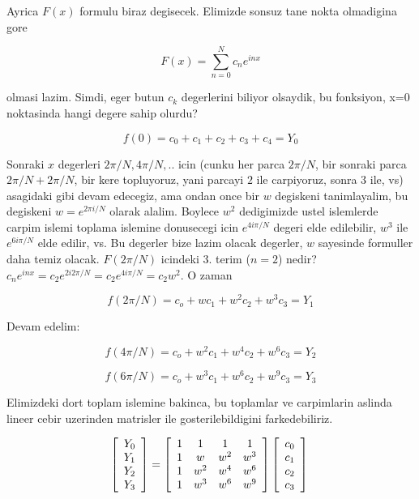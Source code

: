 \documentclass[12pt,fleqn]{article}\usepackage{../common}
\begin{document}
Ayrica $F(x)$ formulu biraz degisecek. Elimizde sonsuz tane nokta olmadigina gore

$$ F(x) = \sum_{n=0}^{N} c_ne^{inx} $$

olmasi lazim. Simdi, eger butun $c_k$ degerlerini biliyor olsaydik, bu
fonksiyon, x=0 noktasinda hangi degere sahip olurdu?

$$ f(0) = c_0 + c_1 + c_2 + c_3 + c_4 = Y_0 $$

Sonraki $x$ degerleri $2\pi/N, 4\pi/N, ..$ icin (cunku her parca $2\pi/N$,
bir sonraki parca $2\pi/N + 2\pi/N$, bir kere topluyoruz, yani parcayi $2$
ile carpiyoruz, sonra $3$ ile, vs) asagidaki gibi devam edecegiz, ama ondan
once bir $w$ degiskeni tanimlayalim, bu degiskeni $w=e^{2\pi i/N}$ olarak
alalim. Boylece $w^2$ dedigimizde ustel islemlerde carpim islemi toplama
islemine donusecegi icin $e^{4i\pi/N}$ degeri elde edilebilir, $w^3$ ile
$e^{6i\pi/N}$ elde edilir, vs. Bu degerler bize lazim olacak degerler, $w$
sayesinde formuller daha temiz olacak. $F(2\pi/N)$ icindeki 3. terim
($n=2$) nedir?  $c_ne^{inx} = c_2e^{2i2\pi/N} = c_2e^{4i\pi/N} = c_2w^2$. O
zaman

$$ f(2\pi/N) = c_o + wc_1 + w^2c_2 + w^3c_3 = Y_1 $$

Devam edelim:

$$ f(4\pi/N) = c_o + w^2c_1 + w^4c_2 + w^6c_3 = Y_2  $$

$$ f(6\pi/N) = c_o + w^3c_1 + w^6c_2 + w^9c_3 = Y_3  $$

Elimizdeki dort toplam islemine bakinca, bu toplamlar ve carpimlarin aslinda
lineer cebir uzerinden matrisler ile gosterilebildigini farkedebiliriz. 

$$  
\left[ \begin{array}{c}
    Y_0 \\
    Y_1 \\
    Y_2 \\
    Y_3
\end{array} \right]
=
\left[ \begin{array}{cccc}
    1 & 1 & 1 & 1 \\
    1 & w & w^2 & w^3  \\
    1 & w^2 & w^4 & w^6  \\
    1 & w^3 & w^6 & w^9  
\end{array} \right]
\left[ \begin{array}{c}
    c_0 \\
    c_1 \\
    c_2 \\
    c_3
\end{array} \right] \\
$$
\end{document}
